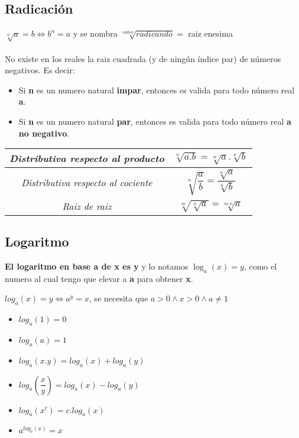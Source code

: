 \documentclass[10pt]{article}
\begin{document}
\subsection{Radicación}
$\sqrt[n]{a} = b \iff b^n=a$ \hfill y se nombra $\sqrt[indice]{radicando} =$ raiz enesima\\ \\
No existe en los reales la raiz cuadrada (y de ningún índice par) de números negativos. Es decir:
\begin{itemize}
\item Si \textbf{n} es un numero natural \textbf{impar}, entonces es valida para todo número real \textbf{a}.
\item Si \textbf{n} es un numero natural \textbf{par}, entonces es valida para todo número real \textbf{a no negativo}.
\end{itemize}
\begin{center}
\end{center}
\begin{table}[h]
\begin{center}
\begin{tabular}{|c|c|}
\hline
\textit{Distributiva respecto al producto} & $\sqrt[n]{a.b} = \sqrt[n]{a}.\sqrt[n]{b}$\\
\hline
\textit{Distributiva respecto al cociente} & $\sqrt[n]{\dfrac{a}{b}} = \dfrac{\sqrt[n]{a}}{\sqrt[n]{b}}$\\
\hline
\textit{Raiz de raiz} & $\sqrt[m]{\sqrt[n]{a}} = \sqrt[m.n]{a}$\\
\hline
\end{tabular}
\end{center}
\end{table}
\newpage
\subsection{Logaritmo}
\textbf{El logaritmo en base a de x es y} y lo notamos $\log_a(x)=y$, como el numero al cual tengo que elevar a \textbf{a} para obtener \textbf{x}.
\begin{center}
$log_a(x)=y \iff a^y=x$, se necesita que $a>0 \land x>0 \land a \not = 1$
\end{center}
\begin{multicols}{2}
\begin{itemize}
\item $log_a(1)=0$
\item $log_a(a)=1$
\item $log_a(x.y)=log_a(x)+log_a(y)$
\item $log_a{\left(\dfrac{x}{y}\right)}=log_a(x)-log_a(y)$
\item $log_a(x^c) = c.log_a(x)$
\item $a^{log_a(x)}=x$
\end{itemize}
\end{multicols}
\begin{center}
\end{center}
\end{document}
